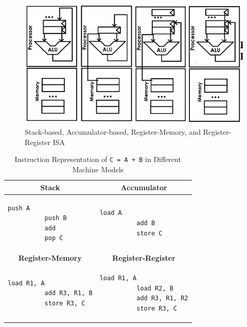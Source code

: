 \documentclass[9pt,twocolumn]{article}
\begin{document}
\begin{figure}[h]
    \includegraphics[scale=0.3]{./assets/001/register-register.png}
    \caption{Stack-based, Accumulator-based, Register-Memory, and Register-Register ISA}
  \end{figure}

  \begin{table}[h]
    \centering
    \begin{tabular}{|l|l|}
      \hline
        \multicolumn{1}{|c|}{\textbf{Stack}} & \multicolumn{1}{c|}{\textbf{Accumulator}} \\
      \hline
        \begin{lstlisting}[gobble=10]
          push A
          push B
          add
          pop C
        \end{lstlisting} &
        \begin{lstlisting}[gobble=10]
          load A
          add B
          store C
        \end{lstlisting} \\
      \hline
        \multicolumn{1}{|c|}{\textbf{Register-Memory}} & \multicolumn{1}{c|}{\textbf{Register-Register}} \\
      \hline
        \begin{lstlisting}[gobble=10]
          load R1, A
          add R3, R1, B
          store R3, C
        \end{lstlisting} &
        \begin{lstlisting}[gobble=10]
          load R1, A
          load R2, B
          add R3, R1, R2
          store R3, C
        \end{lstlisting} \\
      \hline
    \end{tabular}
    \caption{Instruction Representation of \texttt{C = A + B} in Different Machine Models}
  \end{table}
\end{document}
